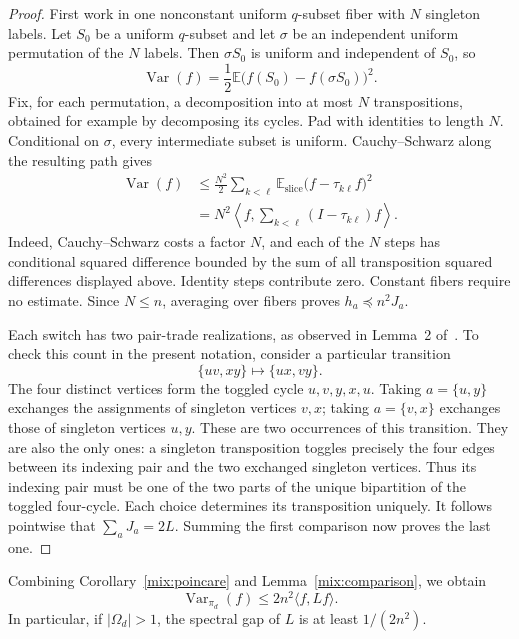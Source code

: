 \begin{proof}
First work in one nonconstant uniform $q$-subset fiber with $N$ singleton
labels. Let $S_0$ be a uniform $q$-subset and let $\sigma$ be an independent
uniform permutation of the $N$ labels. Then $\sigma S_0$ is uniform and
independent of $S_0$, so
\[
\operatorname{Var}(f)=\frac12\mathbb E
\bigl(f(S_0)-f(\sigma S_0)\bigr)^2.
\]
Fix, for each permutation, a decomposition into at most $N$
transpositions, obtained for example by decomposing its cycles. Pad with
identities to length $N$. Conditional on $\sigma$, every intermediate
subset is uniform. Cauchy--Schwarz along the resulting path gives
\begin{align*}
\operatorname{Var}(f)
&\le \frac{N^2}{2}\sum_{k<\ell}
\mathbb E_{\mathrm{slice}}
\bigl(f-\tau_{k\ell}f\bigr)^2\\
&=N^2\left\langle f,
\sum_{k<\ell}(I-\tau_{k\ell})f\right\rangle.
\end{align*}
Indeed, Cauchy--Schwarz costs a factor $N$, and each of the $N$ steps has
conditional squared difference bounded by the sum of all transposition
squared differences displayed above. Identity steps contribute zero.
Constant fibers require no estimate. Since $N\le n$, averaging over
fibers proves $h_a\preceq n^2J_a$.

Each switch has two pair-trade realizations, as observed in
Lemma~2 of~\cite{CBS18}. To check this count in the present notation,
consider a particular transition
\[
\{uv,xy\}\longmapsto\{ux,vy\}.
\]
The four distinct vertices form the toggled cycle $u,v,y,x,u$. Taking
$a=\{u,y\}$ exchanges the assignments of singleton vertices $v,x$;
taking $a=\{v,x\}$ exchanges those of singleton vertices $u,y$. These
are two occurrences of this transition. They are also the only ones:
a singleton transposition toggles precisely the four edges between its
indexing pair and the two exchanged singleton vertices. Thus its
indexing pair must be one of the two parts of the unique bipartition of
the toggled four-cycle. Each choice determines its transposition uniquely.
It follows pointwise that $\sum_aJ_a=2L$. Summing the first comparison
now proves the last one.
\end{proof}

Combining Corollary~\ref{mix:poincare} and Lemma~\ref{mix:comparison}, we
obtain
\begin{equation}\label{mix:L-poincare}
\operatorname{Var}_{\pi_d}(f)\le 2n^2\langle f,Lf\rangle.
\end{equation}
In particular, if $|\Omega_d|>1$, the spectral gap of $L$ is at least
$1/(2n^2)$.

